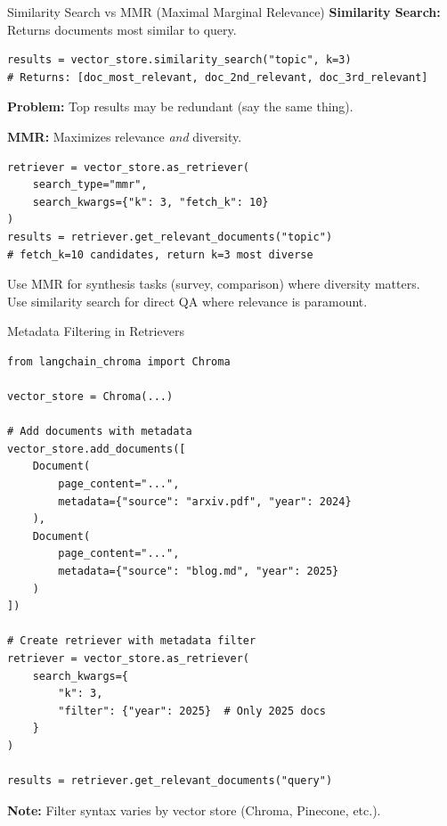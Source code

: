 \documentclass[aspectratio=169,11pt]{beamer}
\begin{document}
\begin{frame}[fragile]{Similarity Search vs MMR (Maximal Marginal Relevance)}
  \textbf{Similarity Search:} Returns documents most similar to query.
  \begin{lstlisting}[basicstyle=\ttfamily\tiny]
results = vector_store.similarity_search("topic", k=3)
# Returns: [doc_most_relevant, doc_2nd_relevant, doc_3rd_relevant]
  \end{lstlisting}

  \textbf{Problem:} Top results may be redundant (say the same thing).

  \vspace{0.07cm}
  \textbf{MMR:} Maximizes relevance \emph{and} diversity.
  \begin{lstlisting}[basicstyle=\ttfamily\tiny]
retriever = vector_store.as_retriever(
    search_type="mmr",
    search_kwargs={"k": 3, "fetch_k": 10}
)
results = retriever.get_relevant_documents("topic")
# fetch_k=10 candidates, return k=3 most diverse
  \end{lstlisting}

  \vspace{0.07cm}
  \begin{tipbox}
    Use MMR for synthesis tasks (survey, comparison) where diversity matters.\\
    Use similarity search for direct QA where relevance is paramount.
  \end{tipbox}
\end{frame}

\begin{frame}[fragile]{Metadata Filtering in Retrievers}
  \begin{lstlisting}
from langchain_chroma import Chroma

vector_store = Chroma(...)

# Add documents with metadata
vector_store.add_documents([
    Document(
        page_content="...",
        metadata={"source": "arxiv.pdf", "year": 2024}
    ),
    Document(
        page_content="...",
        metadata={"source": "blog.md", "year": 2025}
    )
])

# Create retriever with metadata filter
retriever = vector_store.as_retriever(
    search_kwargs={
        "k": 3,
        "filter": {"year": 2025}  # Only 2025 docs
    }
)

results = retriever.get_relevant_documents("query")
  \end{lstlisting}

  \vspace{0.07cm}
  \textbf{Note:} Filter syntax varies by vector store (Chroma, Pinecone, etc.).
\end{frame}
\end{document}
